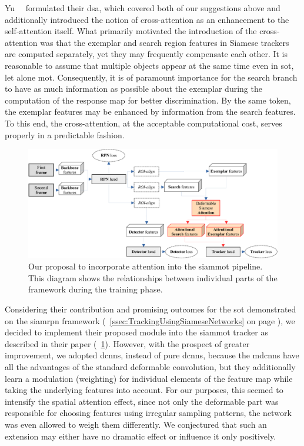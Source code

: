Yu~\etal{}~\cite{yu2021dsa} formulated their \gls{dsa}, which covered both of our suggestions above and additionally introduced the notion of cross-attention as an enhancement to the self-attention itself. What primarily motivated the introduction of the cross-attention was that the exemplar and search region features in Siamese trackers are computed separately, yet they may frequently compensate each other. It is reasonable to assume that multiple objects appear at the same time even in \gls{sot}, let alone \gls{mot}. Consequently, it is of paramount importance for the search branch to have as much information as possible about the exemplar during the computation of the response map for better discrimination. By the same token, the exemplar features may be enhanced by information from the search features. To this end, the cross-attention, at the acceptable computational cost, serves properly in a predictable fashion.

\begin{figure}[t]
    \centerline{\includegraphics[width=\linewidth]{figures/siamese_tracking/siammot_attention_training.pdf}}
    \caption[\Gls{siammot} with attention]{Our proposal to incorporate attention into the \gls{siammot} pipeline. This diagram shows the relationships between individual parts of the framework during the training phase.}
    \label{fig:SiamMOTWithAttention}
\end{figure}

Considering their contribution and promising outcomes for the \gls{sot} demonstrated on the \gls{siamrpn} framework (\sectiontext{}~\ref{ssec:TrackingUsingSiameseNetworks} on page \pageref{ssec:TrackingUsingSiameseNetworks}), we decided to implement their proposed module into the \gls{siammot} tracker as described in their paper (\figtext{}~\ref{fig:SiamMOTWithAttention}). However, with the prospect of greater improvement, we adopted \glspl{dcnn}, instead of pure \glspl{dcnn}, because the \Glspl{mdcnn} have all the advantages of the standard deformable convolution, but they additionally learn a modulation (weighting) for individual elements of the feature map while taking the underlying features into account. For our purposes, this seemed to intensify the spatial attention effect, since not only the deformable part was responsible for choosing features using irregular sampling patterns, the network was even allowed to weigh them differently. We conjectured that such an extension may either have no dramatic effect or influence it only positively.

